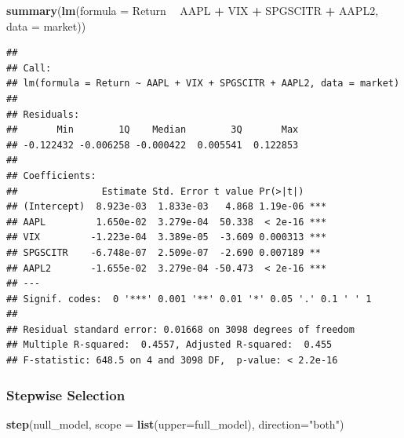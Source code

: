 \documentclass[]{article}
\newenvironment{Shaded}{\begin{snugshade}}{\end{snugshade}}
\newcommand{\KeywordTok}[1]{\textcolor[rgb]{0.13,0.29,0.53}{\textbf{#1}}}
\newcommand{\DataTypeTok}[1]{\textcolor[rgb]{0.13,0.29,0.53}{#1}}
\newcommand{\StringTok}[1]{\textcolor[rgb]{0.31,0.60,0.02}{#1}}
\newcommand{\OperatorTok}[1]{\textcolor[rgb]{0.81,0.36,0.00}{\textbf{#1}}}
\newcommand{\NormalTok}[1]{#1}
\begin{document}
\begin{Shaded}
\begin{Highlighting}[]
\KeywordTok{summary}\NormalTok{(}\KeywordTok{lm}\NormalTok{(}\DataTypeTok{formula =}\NormalTok{ Return }\OperatorTok{~}\StringTok{ }\NormalTok{AAPL }\OperatorTok{+}\StringTok{ }\NormalTok{VIX }\OperatorTok{+}\StringTok{ }\NormalTok{SPGSCITR }\OperatorTok{+}\StringTok{ }\NormalTok{AAPL2, }\DataTypeTok{data =}\NormalTok{ market))}
\end{Highlighting}
\end{Shaded}

\begin{verbatim}
## 
## Call:
## lm(formula = Return ~ AAPL + VIX + SPGSCITR + AAPL2, data = market)
## 
## Residuals:
##       Min        1Q    Median        3Q       Max 
## -0.122432 -0.006258 -0.000422  0.005541  0.122853 
## 
## Coefficients:
##               Estimate Std. Error t value Pr(>|t|)    
## (Intercept)  8.923e-03  1.833e-03   4.868 1.19e-06 ***
## AAPL         1.650e-02  3.279e-04  50.338  < 2e-16 ***
## VIX         -1.223e-04  3.389e-05  -3.609 0.000313 ***
## SPGSCITR    -6.748e-07  2.509e-07  -2.690 0.007189 ** 
## AAPL2       -1.655e-02  3.279e-04 -50.473  < 2e-16 ***
## ---
## Signif. codes:  0 '***' 0.001 '**' 0.01 '*' 0.05 '.' 0.1 ' ' 1
## 
## Residual standard error: 0.01668 on 3098 degrees of freedom
## Multiple R-squared:  0.4557, Adjusted R-squared:  0.455 
## F-statistic: 648.5 on 4 and 3098 DF,  p-value: < 2.2e-16
\end{verbatim}

\subsubsection{Stepwise Selection}\label{stepwise-selection}

\begin{Shaded}
\begin{Highlighting}[]
\KeywordTok{step}\NormalTok{(null_model, }\DataTypeTok{scope =} \KeywordTok{list}\NormalTok{(}\DataTypeTok{upper=}\NormalTok{full_model), }\DataTypeTok{direction=}\StringTok{"both"}\NormalTok{)}
\end{Highlighting}
\end{Shaded}
\end{document}
